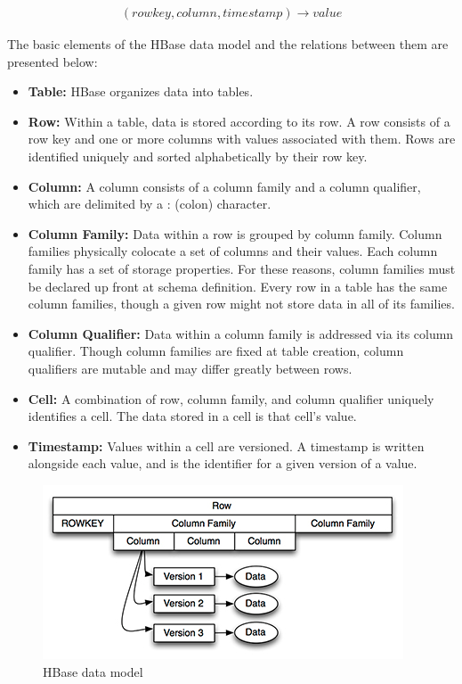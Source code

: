 \begin{gather*}
(rowkey, column, timestamp) \rightarrow value
\end{gather*}

The basic elements of the HBase data model and the relations between them are presented below:
\begin{itemize}
\item \textbf{Table:} HBase organizes data into tables.
\item \textbf{Row:} Within a table, data is stored according to its row. A row consists of a row key and one or more columns with values associated with them. Rows are identified uniquely and sorted alphabetically by their row key.
\item \textbf{Column:} A column consists of a column family and a column qualifier, which are delimited by a : (colon) character.
\item \textbf{Column Family:} Data within a row is grouped by column family. Column families physically colocate a set of columns and their values. Each column family has a set of storage properties. For these reasons, column families must be declared up front at schema definition. Every row in a table has the same column families, though a given row might not store data in all of its families.
\item \textbf{Column Qualifier:} Data within a column family is addressed via its column
qualifier. Though column families are fixed at table creation, column qualifiers are mutable and may differ greatly between rows.
\item \textbf{Cell:} A combination of row, column family, and column qualifier uniquely identifies a cell. The data stored in a cell is that cell's value.
\item \textbf{Timestamp:} Values within a cell are versioned. A timestamp is written alongside each value, and is the identifier for a given version of a value.
\end{itemize}

\begin{figure}[H]
\centering
\includegraphics{figures/hbase_data_model}
\caption{HBase data model}
\label{figure:hbase_data_model}
\end{figure}

